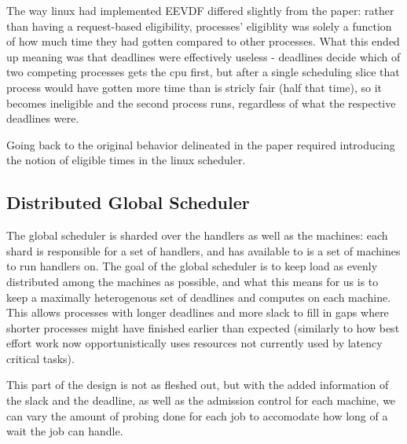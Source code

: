 The way linux had implemented EEVDF differed slightly from the paper: rather
than having a request-based eligibility, processes' eligiblity was solely a
function of how much time they had gotten compared to other processes. What this
ended up meaning was that deadlines were effectively useless - deadlines decide
which of two competing processes gets the cpu first, but after a single
scheduling slice that process would have gotten more time than is stricly fair
(half that time), so it becomes ineligible and the second process runs,
regardless of what the respective deadlines were. 

Going back to the original behavior delineated in the paper required introducing
the notion of eligible times in the linux scheduler. 



\subsection*{Distributed Global Scheduler}

The global scheduler is sharded over the handlers as well as the machines: each
shard is responsible for a set of handlers, and has available to is a set of
machines to run handlers on. The goal of the global scheduler is to keep load as
evenly distributed among the machines as possible, and what this means for us is
to keep a maximally heterogenous set of deadlines and computes on each machine.
This allows processes with longer deadlines and more slack to fill in gaps where
shorter processes might have finished earlier than expected (similarly to how
best effort work now opportunistically uses resources not currently used by
latency critical tasks).

This part of the design is not as fleshed out, but with the added information of
the slack and the deadline, as well as the admission control for each machine,
we can vary the amount of probing done for each job to accomodate how long of a
wait the job can handle.

